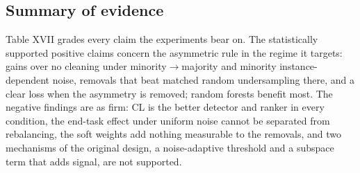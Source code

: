 \documentclass[conference]{IEEEtran}
\begin{document}
\subsection{Summary of evidence}\label{sec:summary-of-evidence}

Table XVII grades every claim the experiments bear on. The statistically supported positive claims concern the asymmetric rule in the regime it targets: gains over no cleaning under minority$\rightarrow $majority and minority instance-dependent noise, removals that beat matched random undersampling there, and a clear loss when the asymmetry is removed; random forests benefit most. The negative findings are as firm: CL is the better detector and ranker in every condition, the end-task effect under uniform noise cannot be separated from rebalancing, the soft weights add nothing measurable to the removals, and two mechanisms of the original design, a noise-adaptive threshold and a subspace term that adds signal, are not supported.
\end{document}
